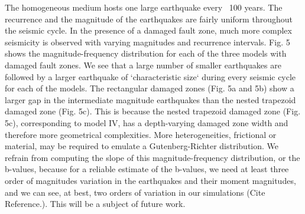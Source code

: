 \documentclass[11pt]{article}
\newcommand{\yihe}[1]{{\color{red}#1}}
\newcommand{\nathan}[1]{{\color{brown}#1}}
\begin{document}
The homogeneous medium hosts one large earthquake every ~100 years. The recurrence and the magnitude of the earthquakes are fairly uniform throughout the seismic cycle. In the presence of a damaged fault zone, much more complex seismicity is observed with varying magnitudes and recurrence intervals. Fig. 5 shows the magnitude-frequency distribution for each of the three models with damaged fault zones. We see that a large number of smaller earthquakes are followed by a larger earthquake of `characteristic size` during every seismic cycle for each of the models. \nathan{The rectangular damaged zones (Fig. 5a and 5b) show a larger gap in the intermediate magnitude earthquakes than the nested trapezoid damaged zone (Fig. 5c)}. This is because the \nathan{nested trapezoid damaged zone (Fig. 5c), corresponding to model IV, has a depth-varying damaged zone width and therefore more geometrical complexities}. More heterogeneities, frictional or material, may be required to emulate a Gutenberg-Richter distribution. We refrain from computing the slope of this magnitude-frequency distribution, or the b-values, because for a reliable estimate of the b-values, we need at least three order of magnitudes variation in the earthquakes and their moment magnitudes, and we can see, at best, two orders of variation in our simulations (\yihe{Cite Reference.}). This will be a subject of future work.
\end{document}
